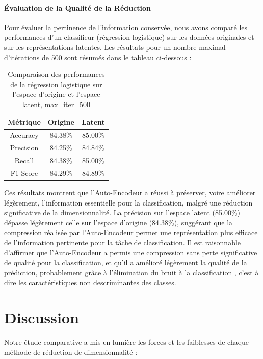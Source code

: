 \documentclass[unnumsec,webpdf,modern,large]{projet_manifold}%
\theoremstyle{thmstyleone}%
\theoremstyle{thmstyletwo}%
\theoremstyle{thmstylethree}%
\begin{document}
\paragraph{Évaluation de la Qualité de la Réduction}
Pour évaluer la pertinence de l'information conservée, nous avons comparé les performances d'un classifieur (régression logistique) sur les données originales et sur les représentations latentes. Les résultats pour un nombre maximal d'itérations de 500 sont résumés dans le tableau ci-dessous :

\begin{table}[h]
\centering
\begin{tabular}{|c|c|c|}
\hline
\textbf{Métrique} & \textbf{Origine} & \textbf{Latent} \\ \hline
Accuracy          & 84.38\%           & 85.00\%         \\ \hline
Precision         & 84.25\%           & 84.84\%         \\ \hline
Recall            & 84.38\%           & 85.00\%         \\ \hline
F1-Score          & 84.29\%           & 84.89\%         \\ \hline
\end{tabular}
\caption{Comparaison des performances de la régression logistique sur l'espace d'origine et l'espace latent, max_iter=500}
\end{table}

Ces résultats montrent que l'Auto-Encodeur a réussi à préserver, voire améliorer légèrement, l'information essentielle pour la classification, malgré une réduction significative de la dimensionnalité. La précision sur l'espace latent (85.00\%) dépasse légèrement celle sur l'espace d'origine (84.38\%), suggérant que la compression réalisée par l'Auto-Encodeur permet une représentation plus efficace de l'information pertinente pour la tâche de classification.
Il est raisonnable d'affirmer que l'Auto-Encodeur a permis une compression sans perte significative de qualité pour la classification, et qu'il a amélioré légèrement la qualité de la prédiction, probablement grâce à l'élimination du bruit à la classification , c'est à dire les caractéristiques non descriminantes des classes.




\section{Discussion}

Notre étude comparative a mis en lumière les forces et les faiblesses de chaque méthode de réduction de dimensionnalité :
\end{document}
